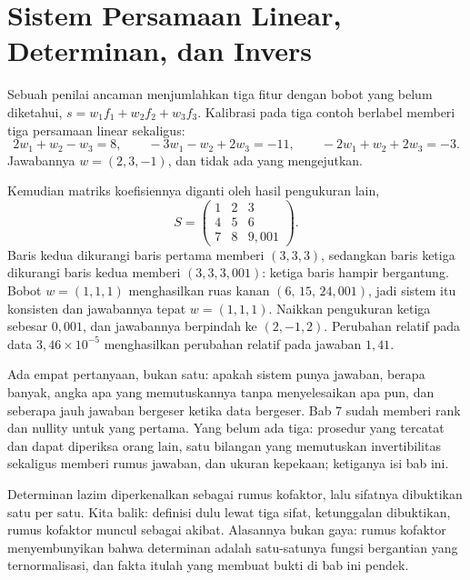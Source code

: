 \chapter{Sistem Persamaan Linear, Determinan, dan Invers}

Sebuah penilai ancaman menjumlahkan tiga fitur dengan bobot yang belum diketahui,
$s=w_{1}f_{1}+w_{2}f_{2}+w_{3}f_{3}$. Kalibrasi pada tiga contoh berlabel memberi tiga
persamaan linear sekaligus:
\[
  2w_{1}+w_{2}-w_{3}=8,\qquad
  -3w_{1}-w_{2}+2w_{3}=-11,\qquad
  -2w_{1}+w_{2}+2w_{3}=-3 .
\]
Jawabannya $w=(2,3,-1)$, dan tidak ada yang mengejutkan.

Kemudian matriks koefisiennya diganti oleh hasil pengukuran lain,
\[
  S=\begin{pmatrix}1&2&3\\ 4&5&6\\ 7&8&9{,}001\end{pmatrix}.
\]
Baris kedua dikurangi baris pertama memberi $(3,3,3)$, sedangkan baris ketiga dikurangi
baris kedua memberi $(3,3,3{,}001)$: ketiga baris hampir bergantung. Bobot $w=(1,1,1)$
menghasilkan ruas kanan $(6,\,15,\,24{,}001)$, jadi sistem itu konsisten dan jawabannya tepat
$w=(1,1,1)$. Naikkan pengukuran ketiga sebesar $0{,}001$, dan jawabannya berpindah ke
$(2,-1,2)$. Perubahan relatif pada data $3{,}46\times10^{-5}$ menghasilkan perubahan relatif
pada jawaban $1{,}41$.

Ada empat pertanyaan, bukan satu: apakah sistem punya jawaban, berapa banyak, angka apa yang
memutuskannya tanpa menyelesaikan apa pun, dan seberapa jauh jawaban bergeser ketika data
bergeser. Bab 7 sudah memberi rank dan nullity untuk yang pertama. Yang belum ada tiga:
prosedur yang tercatat dan dapat diperiksa orang lain, satu bilangan yang memutuskan
invertibilitas sekaligus memberi rumus jawaban, dan ukuran kepekaan; ketiganya isi bab ini.

Determinan lazim diperkenalkan sebagai rumus kofaktor, lalu sifatnya dibuktikan satu per
satu. Kita balik: definisi dulu lewat tiga sifat, ketunggalan dibuktikan, rumus kofaktor
muncul sebagai akibat. Alasannya bukan gaya: rumus kofaktor menyembunyikan bahwa determinan
adalah satu-satunya fungsi bergantian yang ternormalisasi, dan fakta itulah yang membuat
bukti di bab ini pendek.


